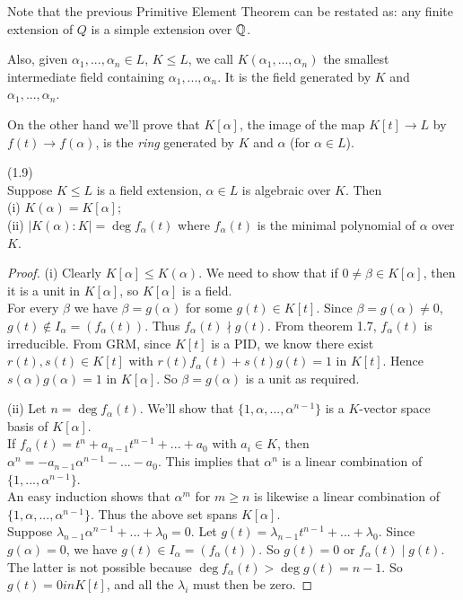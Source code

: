 \documentclass[a4paper]{article}
\begin{document}
Note that the previous Primitive Element Theorem can be restated as: any finite extension of $Q$ is a simple extension over $\mathbb{Q}$.

Also, given $\alpha_1,...,\alpha_n \in L$, $K \leq L$, we call $K(\alpha_1,...,\alpha_n)$ the smallest intermediate field containing $\alpha_1,...,\alpha_n$. It is the field generated by $K$ and $\alpha_1,...,\alpha_n$. 

On the other hand we'll prove that $K[\alpha]$, the image of the map $K[t] \to L$ by $f(t) \to f(\alpha)$, is the \emph{ring} generated by $K$ and $\alpha$ (for $\alpha \in L$).

\begin{thm} (1.9)\\
Suppose $K \leq L$ is a field extension, $\alpha \in L$ is algebraic over $K$. Then\\
(i) $K(\alpha) = K[\alpha]$;\\
(ii) $|K(\alpha):K| = \deg f_\alpha (t)$ where $f_\alpha(t)$ is the minimal polynomial of $\alpha$ over $K$.
\begin{proof}
(i) Clearly $K[\alpha] \leq K(\alpha)$. We need to show that if $0 \neq \beta \in K[\alpha]$, then it is a unit in $K[\alpha]$, so $K[\alpha] $  is a field.\\
For every $\beta$ we have $\beta=g(\alpha)$ for some $g(t) \in K[t]$. Since $\beta = g(\alpha) \neq 0$, $g(t) \not\in I_\alpha = (f_\alpha(t))$. Thus $f_\alpha(t) \nmid g(t)$. From theorem 1.7, $f_\alpha(t)$ is irreducible. From GRM, since $K[t]$ is a PID, we know there exist $r(t),s(t) \in K[t]$ with $r(t) f_\alpha(t) + s(t) g(t) = 1$ in $K[t]$. Hence $s(\alpha) g(\alpha) = 1$ in $K[\alpha]$. So $\beta = g(\alpha)$ is a unit as required.

(ii) Let $n = \deg f_\alpha(t)$. We'll show that $\{1,\alpha,...,\alpha^{n-1}\}$ is a $K$-vector space basis of $K[\alpha]$.\\
If $f_\alpha(t) = t^n + a_{n-1}t^{n-1}+...+a_0$ with $a_i \in K$, then $\alpha^n = -a_{n-1}\alpha^{n-1} -...-a_0$. This implies that $\alpha^n$ is a linear combination of $\{1,...,\alpha^{n-1}\}$.\\
An easy induction shows that $\alpha^m$ for $m \geq n$ is likewise a linear combination of $\{1,\alpha,...,\alpha^{n-1}\}$. Thus the above set spans $K[\alpha]$.\\
Suppose $\lambda_{n-1}\alpha^{n-1}+...+\lambda_0=0$. Let $g(t) = \lambda_{n-1}t^{n-1}+...+\lambda_0$. Since $g(\alpha)=0$, we have $g(t) \in I_\alpha = (f_\alpha(t))$. So $g(t) = 0$ or $f_\alpha(t) \mid g(t)$. The latter is not possible because $\deg f_\alpha(t) > \deg g(t) = n-1$. So $g(t)=0 in K[t]$, and all the $\lambda_i$ must then be zero.
\end{proof}
\end{thm}
\end{document}
